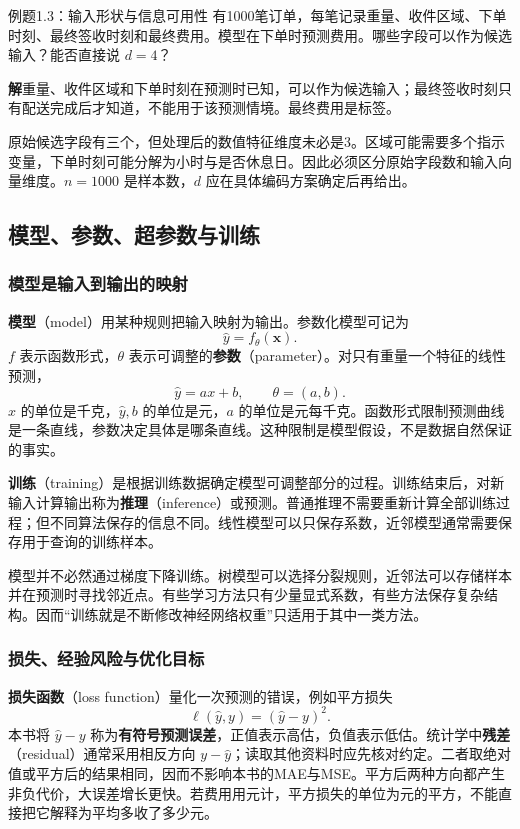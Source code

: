 \documentclass[UTF8,fontset=none,zihao=-4,a4paper]{ctexart}
\newcommand{\term}[1]{\textbf{#1}}
\newcommand{\sol}{\par\noindent\textbf{解}\quad}
\numberwithin{equation}{section}
\numberwithin{figure}{section}
\begin{document}
\begin{infobox}{例题1.3：输入形状与信息可用性}
有1000笔订单，每笔记录重量、收件区域、下单时刻、最终签收时刻和最终费用。模型在下单时预测费用。哪些字段可以作为候选输入？能否直接说 $d=4$？
\end{infobox}
\sol 重量、收件区域和下单时刻在预测时已知，可以作为候选输入；最终签收时刻只有配送完成后才知道，不能用于该预测情境。最终费用是标签。

原始候选字段有三个，但处理后的数值特征维度未必是3。区域可能需要多个指示变量，下单时刻可能分解为小时与是否休息日。因此必须区分原始字段数和输入向量维度。$n=1000$ 是样本数，$d$ 应在具体编码方案确定后再给出。

\subsection{模型、参数、超参数与训练}
\subsubsection{模型是输入到输出的映射}
\term{模型}（model）用某种规则把输入映射为输出。参数化模型可记为
\[
 \widehat y=f_\theta(\symbf{x}).
\]
$f$ 表示函数形式，$\theta$ 表示可调整的\term{参数}（parameter）。对只有重量一个特征的线性预测，
\[
 \widehat y=ax+b,\qquad \theta=(a,b).
\]
$x$ 的单位是千克，$\widehat y,b$ 的单位是元，$a$ 的单位是元每千克。函数形式限制预测曲线是一条直线，参数决定具体是哪条直线。这种限制是模型假设，不是数据自然保证的事实。

\term{训练}（training）是根据训练数据确定模型可调整部分的过程。训练结束后，对新输入计算输出称为\term{推理}（inference）或预测。普通推理不需要重新计算全部训练过程；但不同算法保存的信息不同。线性模型可以只保存系数，近邻模型通常需要保存用于查询的训练样本。

模型并不必然通过梯度下降训练。树模型可以选择分裂规则，近邻法可以存储样本并在预测时寻找邻近点。有些学习方法只有少量显式系数，有些方法保存复杂结构。因而“训练就是不断修改神经网络权重”只适用于其中一类方法。

\subsubsection{损失、经验风险与优化目标}
\term{损失函数}（loss function）量化一次预测的错误，例如平方损失
\[
 \ell(\widehat y,y)=(\widehat y-y)^2.
\]
本书将 $\widehat y-y$ 称为\term{有符号预测误差}，正值表示高估，负值表示低估。统计学中\term{残差}（residual）通常采用相反方向 $y-\widehat y$；读取其他资料时应先核对约定。二者取绝对值或平方后的结果相同，因而不影响本书的MAE与MSE。平方后两种方向都产生非负代价，大误差增长更快。若费用用元计，平方损失的单位为元的平方，不能直接把它解释为平均多收了多少元。
\end{document}
